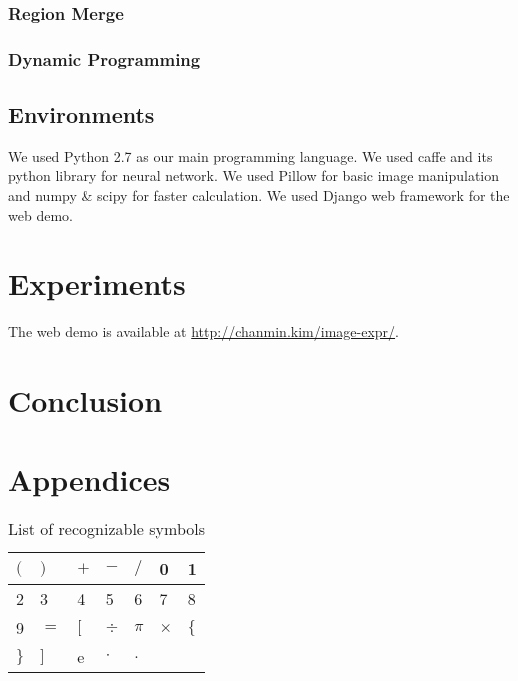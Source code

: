 \documentclass[10pt,twocolumn,letterpaper]{article}
\begin{document}
\subsubsection{Region Merge}

\subsubsection{Dynamic Programming}

\subsection{Environments}

We used Python 2.7 as our main programming language.
We used caffe and its python library for neural network.
We used Pillow for basic image manipulation and numpy \& scipy for faster calculation.
We used Django web framework for the web demo.

\section{Experiments}
%
%
%
%
%


The web demo is available at \url{http://chanmin.kim/image-expr/}.

\section{Conclusion}

{\small


}

\section{Appendices}

\begin{table}[h]
\centering
\label{symbol-list}
\begin{tabular}{|l|l|l|l|l|l|l|}
\hline
$($ & $)$ & $+$ & $-$ & $/$ & 0 & 1 \\ \hline
2 & 3 & 4 & 5 & 6 & 7 & 8 \\ \hline
9 & $=$ & $[$ & $\div$ & $\pi$ & $\times$ & $\{$ \\ \hline
$\}$ & $]$ & e & $\cdot$ & $.$ & & \\
\hline
\end{tabular}
\caption{List of recognizable symbols}
\end{table}
\end{document}
